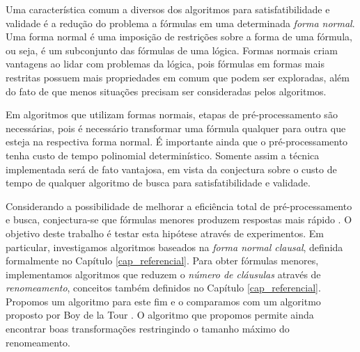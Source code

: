 Uma característica comum a diversos dos algoritmos para satisfatibilidade e validade é a redução do problema a fórmulas em uma determinada \emph{forma normal}. Uma forma normal é uma imposição de restrições sobre a forma de uma fórmula, ou seja, é um subconjunto das fórmulas de uma lógica. Formas normais criam vantagens ao lidar com problemas da lógica, pois fórmulas em formas mais restritas possuem mais propriedades em comum que podem ser exploradas, além do fato de que menos situações precisam ser consideradas pelos algoritmos.

Em algoritmos que utilizam formas normais, etapas de pré-processamento são necessárias, pois é necessário transformar uma fórmula qualquer para outra que esteja na respectiva forma normal. É importante ainda que o pré-processamento tenha custo de tempo polinomial determinístico. Somente assim a técnica implementada será de fato vantajosa, em vista da conjectura sobre o custo de tempo de qualquer algoritmo de busca para satisfatibilidade e validade.

Considerando a possibilidade de melhorar a eficiência total de pré-processamento e busca, conjectura-se que fórmulas menores produzem respostas mais rápido \cite{nonnengart2001computing}. O objetivo deste trabalho é testar esta hipótese através de experimentos. Em particular, investigamos algoritmos baseados na \emph{forma normal clausal}, definida formalmente no Capítulo \ref{cap_referencial}. Para obter fórmulas menores, implementamos algoritmos que reduzem o \emph{número de cláusulas} através de \emph{renomeamento}, conceitos também definidos no Capítulo \ref{cap_referencial}. Propomos um algoritmo para este fim e o comparamos com um algoritmo proposto por Boy de la Tour \cite{de1992optimality}. O algoritmo que propomos permite ainda encontrar boas transformações restringindo o tamanho máximo do renomeamento.
